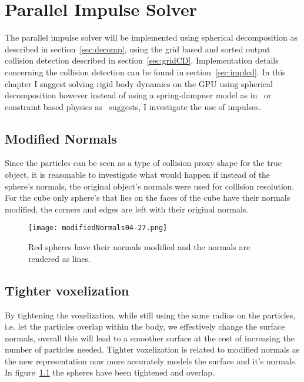\chapter{Parallel Impulse Solver}\label{cha:impl}
The parallel impulse solver will be implemented using spherical decomposition as
 described in section~\ref{sec:decomp}, using the grid based and sorted output
 collision detection described in section~\ref{sec:gridCD}. Implementation details
 concerning the collision detection can be found in section~\ref{sec:implcd}.
In this chapter I suggest solving rigid body dynamics on the GPU using spherical decomposition
however instead of using a spring-dampner model as in~\cite{gpugems} or constraint
based physics as~\cite{flex} suggests, I investigate the use of impulses.

\section{Modified Normals}\label{sec:modnorm}
Since the particles can be seen as a type of collision proxy shape for the true object,
it is reasonable to investigate what would happen if instead of the sphere's normals,
the original object's normals were used for collision resolution. For the cube only
sphere's that lies on the faces of the cube have their normals modified, the corners
and edges are left with their original normals.

\begin{figure}[H]
  \centering
  \texttt{[image: modifiedNormals04-27.png]}
  \caption{Red spheres have their normals modified and the normals are rendered as lines.}
  \label{fig:modnorm}
\end{figure}

\section{Tighter voxelization}
By tightening the voxelization, while still using the same radius on the particles,
i.e. let the particles overlap within the body, we effectively change the surface
normals, overall this will lead to a smoother surface at the cost of increasing the number
of particles needed. Tighter voxelization is related to modified normals as the new
representation now more accurately models the surface and it's normals. In figure~\ref{fig:modnorm}
the spheres have been tightened and overlap.

